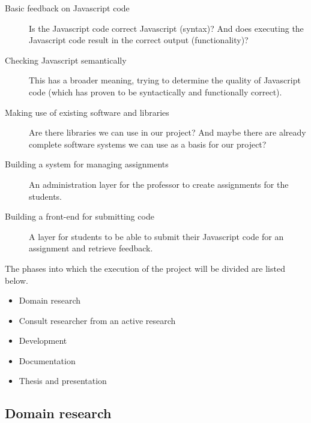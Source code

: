 \documentclass{article}
\begin{document}
\begin{description}
  \item[Basic feedback on Javascript code] Is the Javascript code 
    correct Javascript (syntax)? And does executing the Javascript code result 
    in the correct output (functionality)? 
  \item[Checking Javascript semantically] This has a broader meaning, trying to
    determine the quality of Javascript code (which has proven to be
    syntactically and functionally correct).
  \item[Making use of existing software and libraries] Are there libraries we
    can use in our project? And maybe there are already complete software
    systems we can use as a basis for our project?
  \item[Building a system for managing assignments] An administration layer for
    the professor to create assignments for the students.
  \item[Building a front-end for submitting code] A layer for students to be
    able to submit their Javascript code for an assignment and retrieve
    feedback.
\end{description}

The phases into which the execution of the project will be divided are listed
below.

\begin{itemize}
  \item Domain research
  \item Consult researcher from an active research
  \item Development
  \item Documentation
  \item Thesis and presentation
\end{itemize}

\subsection{Domain research}
\end{document}
